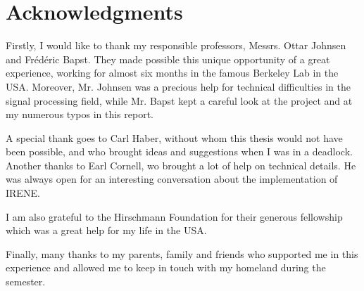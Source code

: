 
\cleardoublepage
\chapter*{Acknowledgments}

Firstly, I would like to thank my responsible professors, Messrs. Ottar Johnsen and Frédéric Bapst. They made possible this unique opportunity of a great experience, working for almost six months in the famous Berkeley Lab in the USA. Moreover, Mr. Johnsen was a precious help for technical difficulties in the signal processing field, while Mr. Bapst kept a careful look at the project and at my numerous typos in this report.

A special thank goes to Carl Haber, without whom this thesis would not have been possible, and who brought ideas and suggestions when I was in a deadlock. Another thanks to Earl Cornell, wo brought a lot of help on technical details. He was always open for an interesting conversation about the implementation of IRENE.

I am also grateful to the Hirschmann Foundation for their generous fellowship which was a great help for my life in the USA.

Finally, many thanks to my parents, family and friends who supported me in this experience and allowed me to keep in touch with my homeland during the semester.

\cleardoublepage
\listoffigures

\cleardoublepage
\listoftables

\cleardoublepage
\lstlistoflistings